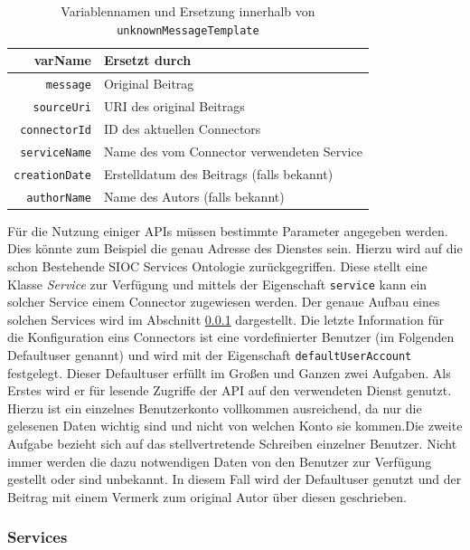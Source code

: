 \begin{table}[ht]
\caption{Variablennamen und Ersetzung innerhalb von \texttt{unknownMessageTemplate} }
\centering
\begin{tabular}{r|l}
\textbf{varName}      & \textbf{Ersetzt durch}                     \\
\hline
\texttt{message}      & Original Beitrag                           \\
\texttt{sourceUri}    & URI des original Beitrags                  \\
\texttt{connectorId}  & ID des aktuellen Connectors                \\
\texttt{serviceName}  & Name des vom Connector verwendeten Service \\
\texttt{creationDate} & Erstelldatum des Beitrags (falls bekannt)  \\
\texttt{authorName}   & Name des Autors (falls bekannt)          
\end{tabular}
\label{tbl:unknown_message_template_vars}
\end{table}

Für die Nutzung einiger APIs müssen bestimmte Parameter angegeben werden. Dies könnte zum Beispiel die genau Adresse des Dienstes sein. Hierzu wird auf die schon Bestehende SIOC Services Ontologie zurückgegriffen. Diese stellt eine Klasse \emph{Service} zur Verfügung und mittels der Eigenschaft \texttt{service} kann ein solcher Service einem Connector zugewiesen werden. Der genaue Aufbau eines solchen Services wird im Abschnitt \ref{ssub:services} dargestellt. Die letzte Information für die Konfiguration eins Connectors ist eine vordefinierter Benutzer (im Folgenden Defaultuser genannt) und wird mit der Eigenschaft \texttt{defaultUserAccount} festgelegt. Dieser Defaultuser erfüllt im Großen und Ganzen zwei Aufgaben. Als Erstes wird er für lesende Zugriffe der API auf den verwendeten Dienst genutzt. Hierzu ist ein einzelnes Benutzerkonto vollkommen ausreichend, da nur die gelesenen Daten wichtig sind und nicht von welchen Konto sie kommen.Die zweite Aufgabe bezieht sich auf das stellvertretende Schreiben einzelner Benutzer. Nicht immer werden die dazu notwendigen Daten von den Benutzer zur Verfügung gestellt oder sind unbekannt. In diesem Fall wird der Defaultuser genutzt und der Beitrag mit einem Vermerk zum original Autor über diesen geschrieben.


\subsubsection{Services} %
\label{ssub:services}

